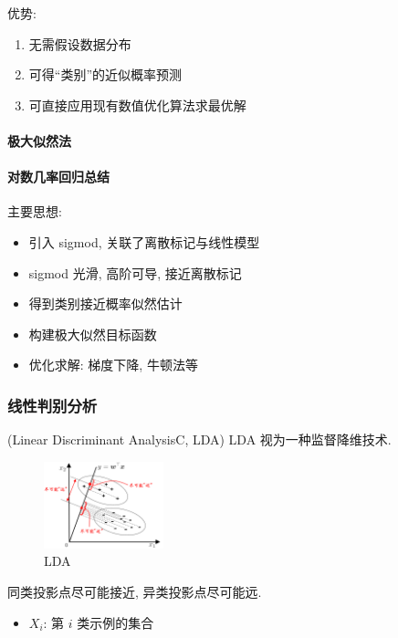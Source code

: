 优势:
\begin{enumerate}
    \item 无需假设数据分布
    \item 可得``类别''的近似概率预测
    \item 可直接应用现有数值优化算法求最优解
\end{enumerate}

\paragraph{极大似然法}


\paragraph{对数几率回归总结}
主要思想:
\begin{itemize}
    \item 引入 sigmod, 关联了离散标记与线性模型
    \item sigmod 光滑, 高阶可导, 接近离散标记
    \item 得到类别接近概率似然估计
    \item 构建极大似然目标函数
    \item 优化求解: 梯度下降, 牛顿法等
\end{itemize}


\subsubsection{线性判别分析}
(Linear Discriminant AnalysisC, LDA)
LDA 视为一种监督降维技术. 

\begin{figure}[!htb]
    \centering
    \includegraphics[width=0.309\textwidth]{pic/ML3/LDA.png}
    \caption{LDA}
\end{figure}
同类投影点尽可能接近, 异类投影点尽可能远. 

\begin{definition}\quad

    \begin{itemize}
        \item $X_i$: 第 $i$ 类示例的集合
    \end{itemize}
\end{definition}


